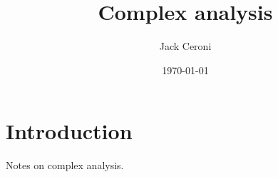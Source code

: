 \documentclass[aps,pra,showpacs,notitlepage,onecolumn,superscriptaddress,nofootinbib]{revtex4-1}
\theoremstyle{definition}
\begin{document}
\title{Complex analysis}
\author{Jack Ceroni}
\date{\today}
\maketitle

\tableofcontents

\newpage

\section{Introduction}

\noindent Notes on complex analysis.
\end{document}
